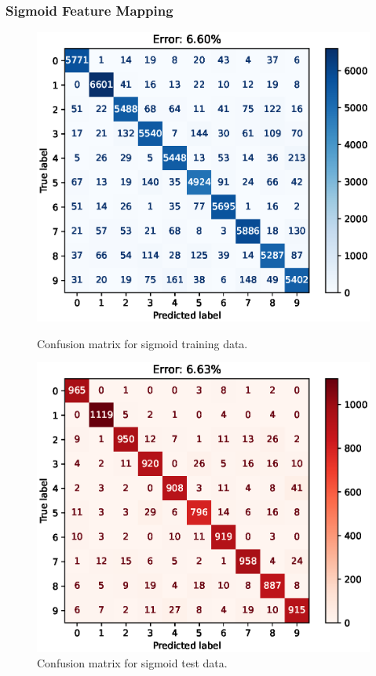 \documentclass{article}
\begin{document}
\FloatBarrier
\subsubsection{Sigmoid Feature Mapping}
\begin{figure}[h!]
    \centering
    \begin{minipage}{0.5\textwidth}
        \centering
        \includegraphics[width=\textwidth]{images/one_vs_all_training_confusion_matrix_Sigmoid.eps}
        \caption{Confusion matrix for sigmoid training data.}
    \end{minipage}\hfill
    \begin{minipage}{0.5\textwidth}
        \centering
        \includegraphics[width=\textwidth]{images/one_vs_all_test_confusion_matrix_Sigmoid.eps}
        \caption{Confusion matrix for sigmoid test data.}
    \end{minipage}
    
\end{figure}
\end{document}
